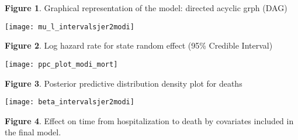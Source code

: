 \documentclass[10pt,letterpaper]{article}
\begin{document}
\textbf{Figure 1}. Graphical representation of the model: directed
acyclic grph (DAG)

\begin{center}\texttt{[image: mu\_l\_intervalsjer2modi]} \end{center}

\textbf{Figure 2}. Log hazard rate for state random effect (95\%
Credible Interval)

\begin{center}\texttt{[image: ppc\_plot\_modi\_mort]} \end{center}

\textbf{Figure 3}. Posterior predictive distribution density plot for
deaths

\begin{center}\texttt{[image: beta\_intervalsjer2modi]} \end{center}

\textbf{Figure 4}. Effect on time from hospitalization to death by
covariates included in the final model.

\nolinenumbers
\end{document}
